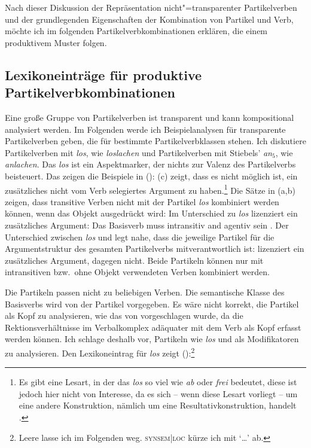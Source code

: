 Nach dieser Diskussion der Repräsentation nicht"=transparenter Partikelverben und 
der grundlegenden Eigenschaften der Kombination von Partikel und Verb, möchte ich
im folgenden Partikelverbkombinationen erklären, die einem produktivem Muster folgen.



\subsection{Lexikoneinträge für produktive Partikelverbkombinationen}
\label{sec-lr-for-transp-pvs}


Eine große Gruppe von Partikelverben ist transparent und kann kompositional analysiert
werden. Im Folgenden werde ich Beispielanalysen für transparente Partikelverben geben,
die für bestimmte Partikelverbklassen stehen. Ich diskutiere Partikelverben mit \emph{los},
wie \zb \emph{loslachen} und Partikelverben mit Stiebels' \emph{an$_5$}, wie \zb \emph{anlachen}.
Das \emph{los} ist ein Aspektmarker, der nichts zur Valenz des Partikelverbs beisteuert.
Das zeigen die Beispiele in ():
\eal
{}
\zl
(c) zeigt, dass es nicht möglich ist, ein zusätzliches nicht vom Verb
selegiertes Argument zu haben.\footnote{
  Es gibt eine Lesart, in der das \emph{los} so viel wie \emph{ab} oder \emph{frei}
  bedeutet, diese ist jedoch hier nicht von Interesse,
  da es sich -- wenn diese Lesart vorliegt -- um eine andere Konstruktion,
  nämlich um eine Resultativkonstruktion, handelt
  \citep[siehe][]{Mueller2002b}.%
}
Die Sätze in (a,b) zeigen, dass transitive Verben nicht mit der Partikel \emph{los}
kombiniert werden können, wenn das Objekt ausgedrückt wird:
\eal
{}
\zl
Im Unterschied zu \emph{los} lizenziert \anf ein zusätzliches Argument:
\eal
{}
\zl
Das Basisverb muss intransitiv and agentiv
sein \citep[]{SW94a}. Der Unterschied zwischen \emph{los} und \anf legt nahe,
dass die jeweilige Partikel für die Argumentstruktur des gesamten Partikelverbs
mitverantwortlich ist: \anf lizenziert ein zusätzliches Argument, \los dagegen nicht.
Beide Partikeln können nur mit intransitiven bzw.\ ohne Objekt verwendeten Verben
kombiniert werden.

Die Partikeln passen nicht zu beliebigen Verben. Die semantische Klasse
des Basisverbs wird von der Partikel vorgegeben. Es wäre nicht korrekt, die Partikel
als Kopf zu analysieren, wie das \zb von \citet[]{Trost91a} vorgeschlagen wurde, 
da die Rektionsverhältnisse im Verbalkomplex adäquater
mit dem Verb als Kopf erfasst werden können. Ich schlage deshalb vor,
Partikeln wie \emph{los} und \anf als Modifikatoren zu analysieren. Den Lexikoneintrag
für \emph{los} zeigt ():\footnote{%
Leere \hconslen lasse ich im Folgenden weg. \textsc{synsem|loc} kürze ich mit `\ldots' ab.}

